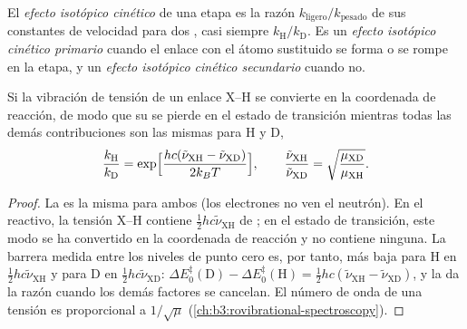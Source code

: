 \begin{definition}\label{def:b3:rate-theories:kie}
El \emph{efecto isotópico cinético} de una etapa es la
razón $k_{\mathrm{ligero}}/k_{\mathrm{pesado}}$ de sus constantes de velocidad para dos , casi siempre
$k_{\mathrm H}/k_{\mathrm D}$. Es un \emph{efecto isotópico cinético primario}
cuando el enlace con el átomo sustituido se forma o se rompe en la
etapa, y un \emph{efecto isotópico cinético secundario}
cuando no.
\end{definition}

\begin{proposition}\label{prop:b3:rate-theories:primary-kie}
Si la vibración de tensión de un enlace X--H se convierte en la coordenada de reacción,
de modo que su  se pierde en el estado de transición mientras todas las demás
contribuciones son las mismas para H y D,
\[
  \frac{k_{\mathrm H}}{k_{\mathrm D}} = \exp\Bigl[\frac{hc(\tilde\nu_{\mathrm{XH}} - \tilde\nu_{\mathrm{XD}})}{2k_BT}\Bigr],
  \qquad \frac{\tilde\nu_{\mathrm{XH}}}{\tilde\nu_{\mathrm{XD}}} = \sqrt{\frac{\mu_{\mathrm{XD}}}{\mu_{\mathrm{XH}}}} .
\]
\end{proposition}

\begin{proof}
La  es la misma para ambos  (los
electrones no ven el neutrón). En el reactivo, la tensión X--H contiene
$\frac12hc\tilde\nu_{\mathrm{XH}}$ de ; en el estado de transición, este modo se ha convertido en
la coordenada de reacción y no contiene ninguna. La barrera medida entre los niveles de punto
cero es, por tanto, más baja para H en $\frac12hc\tilde\nu_{\mathrm{XH}}$ y para D en $\frac12hc\tilde\nu_{\mathrm{XD}}$: $\Delta E_0^{\ddagger}(\mathrm D) -
\Delta E_0^{\ddagger}(\mathrm H) = \frac12hc(\tilde\nu_{\mathrm{XH}} - \tilde\nu_{\mathrm{XD}})$, y la  da la razón cuando
los demás factores se cancelan. El número de onda de una tensión es proporcional a
$1/\sqrt\mu$ (\cref{ch:b3:rovibrational-spectroscopy}).
\end{proof}

